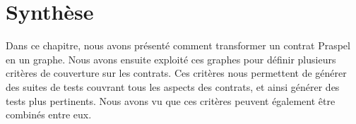 \section{Synthèse}
\label{section:test:summary}

Dans ce chapitre, nous avons présenté comment transformer un contrat Praspel en
un graphe. Nous avons ensuite exploité ces graphes pour définir plusieurs
critères de couverture sur les contrats. Ces critères nous permettent de générer
des suites de tests couvrant tous les aspects des contrats, et ainsi générer des
tests plus pertinents. Nous avons vu que ces critères peuvent également être
combinés entre eux.
